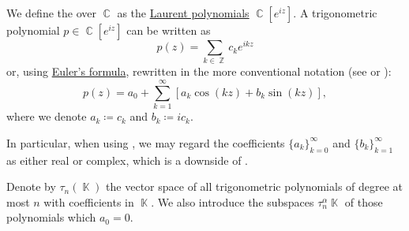 \begin{definition}\label{def:trigonometric_polynomial}
  We define the  over \( \BbbC \) as the \hyperref[def:ring_of_laurent_polynomials]{Laurent polynomials} \( \BbbC[e^{iz}] \). A trigonometric polynomial \( p \in \BbbC[e^{iz}] \) can be written as
  \begin{equation}\label{def:trigonometric_polynomial/exponential}
    p(z) = \sum_{k \in \BbbZ} c_k e^{ikz}
  \end{equation}
  or, using \hyperref[thm:exponential_trigonometric_identities/eulers_formula]{Euler's formula}, rewritten in the more conventional notation (see \cite[1]{Боянов2008} or \cite[88]{Rudin1986RealAndComplex}):
  \begin{equation}\label{def:trigonometric_polynomial/trigonometric}
    p(z) = a_0 + \sum_{k=1}^\infty [ a_k \cos(kz) + b_k \sin(kz) ],
  \end{equation}
  where we denote \( a_k \coloneqq c_k \) and \( b_k \coloneqq ic_k \).

  In particular, when using , we may regard the coefficients \( \{ a_k \}_{k=0}^\infty \) and \( \{ b_k \}_{k=1}^\infty \) as either real or complex, which is a downside of .

  Denote by \( \tau_n(\BbbK) \) the vector space of all trigonometric polynomials of degree at most \( n \) with coefficients in \( \BbbK \). We also introduce the subspaces \( \tau_n^\alpha{\BbbK} \) of those polynomials which \( a_0 = 0 \).
\end{definition}

